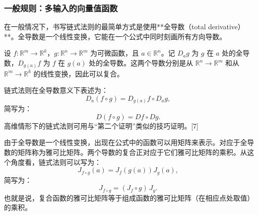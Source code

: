 \subsubsection{一般规则：多输入的向量值函数}
在一般情况下，书写链式法则的最简单方式是使用**全导数（total derivative）**。全导数是一个线性变换，它能在一个公式中同时刻画所有方向导数。

设 $f: \mathbb{R}^m \to \mathbb{R}^k$，$g: \mathbb{R}^n \to \mathbb{R}^m$ 为可微函数，且 $a \in \mathbb{R}^n$。记 $D_a g$ 为 $g$ 在 $a$ 处的全导数，$D_{g(a)} f$ 为 $f$ 在 $g(a)$ 处的全导数。这两个导数分别是从 $\mathbb{R}^n \to \mathbb{R}^m$ 和从 $\mathbb{R}^m \to \mathbb{R}^k$ 的线性变换，因此可以复合。

链式法则在全导数意义下表述为：
$$
D_a(f \circ g) = D_{g(a)} f \circ D_a g,~
$$
简写为：
$$
D(f \circ g) = Df \circ Dg.~
$$
高维情形下的链式法则可用与“第二个证明”类似的技巧证明。[7]

由于全导数是一个线性变换，出现在公式中的函数可以用矩阵来表示。对应于全导数的矩阵称为雅可比矩阵。两个导数的复合正对应于它们雅可比矩阵的乘积。从这个角度看，链式法则可以写为：
$$
J_{f \circ g}(a) = J_f(g(a)) J_g(a),~
$$
简写为：
$$
J_{f \circ g} = (J_f \circ g)\, J_g.~
$$
也就是说，复合函数的雅可比矩阵等于组成函数的雅可比矩阵（在相应点处取值）的乘积。
